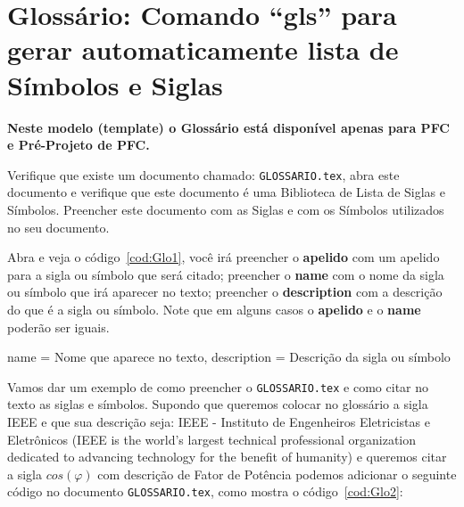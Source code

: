 
\begin{Codigo}[language=tex, caption=Código para acrescentar PDF da Folha de Aprovação, label=cod:FolhaAprovacao]
%
 
%
\end{Codigo}


\section{Glossário: Comando ``gls'' para  gerar automaticamente lista de Símbolos e Siglas}
\label{sec:Glossario}

{\bf Neste modelo (template) o Glossário está disponível apenas para PFC e Pré-Projeto de PFC.}

Verifique que existe um documento chamado: \verb|GLOSSARIO.tex|, abra este documento e verifique que este documento é uma Biblioteca de Lista de Siglas e Símbolos. Preencher este documento com as Siglas e com os Símbolos utilizados no seu documento.

Abra e veja o código~\ref{cod:Glo1}, você irá preencher o {\bf apelido} com um apelido para a sigla ou símbolo que será citado; preencher o {\bf name} com o nome da sigla ou símbolo que irá aparecer no texto; preencher o {\bf description} com a descrição do que é a sigla ou símbolo. Note que em alguns casos o {\bf apelido} e o {\bf name} poderão ser iguais.


\begin{Codigo}[language=tex, caption=Biblioteca de Glossários~ {\bf GLOSSARIO.TEX}, label=cod:Glo1]
    {
    name = {Nome que aparece no texto},
    description = {Descrição da sigla ou símbolo}
    }
\end{Codigo}

Vamos dar um exemplo de como preencher o \verb|GLOSSARIO.tex| e como citar no texto as siglas e símbolos. Supondo que queremos colocar no glossário a sigla IEEE e que sua descrição seja: IEEE - Instituto de Engenheiros Eletricistas e Eletrônicos (IEEE is the world's largest technical professional organization dedicated to advancing technology for the benefit of humanity) e queremos citar a sigla $cos(\varphi)$ com descrição de {Fator de Potência} podemos adicionar o seguinte código no documento \verb|GLOSSARIO.tex|, como mostra o código~\ref{cod:Glo2}:

